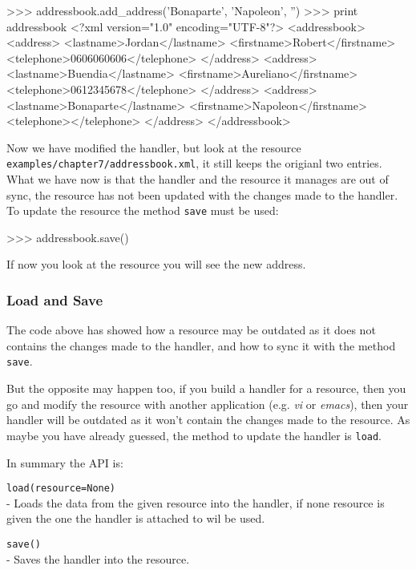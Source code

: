 \begin{code}
    >>> addressbook.add_address('Bonaparte', 'Napoleon', '')
    >>> print addressbook
    <?xml version="1.0" encoding="UTF-8"?>
    <addressbook>
      <address>
        <lastname>Jordan</lastname>
        <firstname>Robert</firstname>
        <telephone>0606060606</telephone>
      </address>
      <address>
        <lastname>Buendia</lastname>
        <firstname>Aureliano</firstname>
        <telephone>0612345678</telephone>
     </address>
     <address>
       <lastname>Bonaparte</lastname>
       <firstname>Napoleon</firstname>
       <telephone></telephone>
     </address>
   </addressbook>
\end{code}

Now we have modified the handler, but look at the resource
{\tt examples/chapter7/addressbook.xml}, it still keeps the origianl two
entries. What we have now is that the handler and the resource it manages
are out of sync, the resource has not been updated with the changes made
to the handler. To update the resource the method {\tt save} must be used:

\begin{code}
    >>> addressbook.save()
\end{code}

If now you look at the resource you will see the new address.


\subsubsection{Load and Save}

The code above has showed how a resource may be outdated as it does not
contains the changes made to the handler, and how to sync it with the
method {\tt save}.

But the opposite may happen too, if you build a handler for a resource,
then you go and modify the resource with another application (e.g. {\em vi}
or {\em emacs}), then your handler will be outdated as it won't contain the
changes made to the resource. As maybe you have already guessed, the method
to update the handler is {\tt load}.

In summary the API is:

\begin{api}
  {\tt load(resource=None)}\\
  - Loads the data from the given resource into the handler, if none
    resource is given the one the handler is attached to wil be used.

  {\tt save()}\\
  - Saves the handler into the resource.
\end{api}


\subsubsection{}